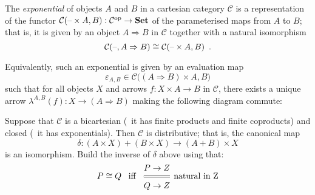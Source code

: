 \begin{definition}[Exponentials]
The \emph{exponential} of objects $A$ and $B$ in a cartesian category
$\mathcal{C}$ is a representation of the functor 
$\mathcal C(\text{--}\times A,B):\mathcal C^{\mathrm{op}}\to\mathbf {Set}$ of the parameterised
maps from $A$ to $B$; that is, it is given by an object $A\Rightarrow B$ in
$\mathcal C$ together with a natural isomorphism
\[  
  \mathcal{C}(\text{--}, A \Rightarrow B) 
  \cong 
  \mathcal{C}(\text{--}\times A, B)  
  \enspace.
\]
\end{definition}
%
Equivalently, such an exponential is given by an evaluation map 
\[
  \varepsilon_{A,B} \in \mathcal{C}\big((A \Rightarrow B) \times A, B\big)
\]
such that for all objects $X$ and arrows $f: X \times A \to B$ in
$\mathcal{C}$, there exists a unique arrow 
$\lambda^{A,B}(f) : X \rightarrow (A \Rightarrow B)$ making the following
diagram commute: 
\begin{center}
\end{center}

\begin{exercise}
Suppose that $\mathcal{C}$ is a bicartesian (\ie~it has
finite products and finite coproducts) and closed (\ie~it has exponentials).
Then $\mathcal{C}$ is distributive; that is, the canonical map
\[  
  \delta: (A \times X) + (B \times X) \rightarrow (A + B )\times X
\]
is an isomorphism.
%
Build the inverse of $\delta$ above using that:
\[ 
  P \cong Q 
  \enspace \text{ iff }  \enspace 
  \Efrac{P \rightarrow Z}{Q \rightarrow Z}\ \text{natural in Z} 
\]
\end{exercise}
